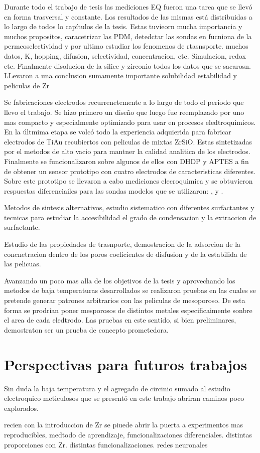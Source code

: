 Durante todo el trabajo de tesis las mediciones EQ fueron una tarea que se llevó en forma trasversal y constante. Los resultados de las mismas está distribuidas a lo largo de todos lo capítulos de la tesis.  Estas tuvieorn mucha importancia y muchos propositos, caracetrizar las PDM, detedctar las sondas en fucniona de la permeoselectividad y por ultimo estudiar los fenomenos de rtasnsporte.
muchos datos, K, hopping, difusion, selectividad, concentracion, etc. Simulacion, redox etc. Finalmente disolucion de la silice y zirconio
todos los datos que se sacarosn. LLevaron a una conclusion sumamente importante solubilidad estabilidad y peliculas de Zr

Se fabricaciones electrodos recurrenetemente a lo largo de todo el periodo que llevo el trabajo. Se hizo primero un diseño que luego fue reemplazado por uno mas compacto y especialmente optimizado para usar en procesos eledtroquimicos. En la últmima etapa se volcó todo la experiencia adquierida para fabricar electrodos de Ti\textbar Au recubiertos con peliculas de mixtas ZrSiO. Estas sintetizadas por el metodos de alto vacio para mantner la calidad analitica de los electrodos. Finalmente se funcionalizaron sobre algunos de ellos con DHDP y APTES a fin de obtener un sensor prototipo con cuatro electrodos de caracteristicas diferentes. Sobre este prototipo se llevaron a cabo mediciones elecroquimica y se obtuvieron respuestas diferenciailes para las sondas modelos que se utilizaron: \ferroferri, \ferroceno y \aminorutenio.   


Metodos de sintesis alternativos, estudio sistematico con diferentes surfactantes y tecnicas para estudiar la accesibilidad el grado de condensacion y la extraccion de surfactante.

Estudio de las propiedades de trasnporte, demostracion de la adsorcion de la concnetracion dentro de los poros coeficientes de disfusion y de la estabilida de las pelicuas.

Avanzando un poco mas alla de los objetivos de la tesis y aprovechando los metodos de baja temperaturas desarrollados se realizaron pruebas en las cuales se pretende generar patrones arbitrarios con las peliculas de mesoporoso. De esta forma se prodrian poner mesporosos de distintos metales especificaimente sonbre el area de cada eledtrodo. Las pruebas en este sentido, si bien preliminares, demostraton ser un prueba de concepto prometedora.

\section*{Perspectivas para futuros trabajos}

Sin duda la baja temperatura y el agregado de circinio sumado al estudio electroquico meticulosos que se presentó en este trabajo abriran caminos poco explorados.

recien con la introduccion de Zr se piuede abrir la puerta a experimentos mas reproducibles, medtodo de aprendizaje, funcionalizaciones diferenciales. distintas proporciones con Zr. distintas funcionalizaciones.
redes neuronales

\newpage

